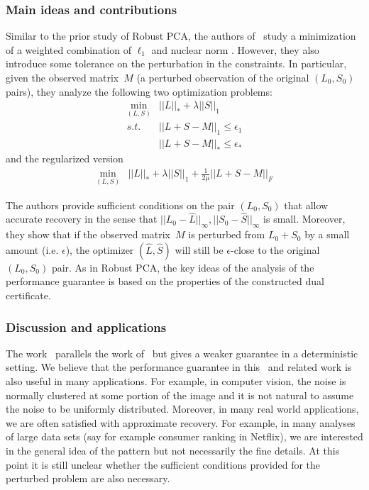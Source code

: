 \subsubsection{Main ideas and contributions}
%
Similar to the prior study of Robust PCA, the authors of~\cite{Hsu:2011ys} study a minimization
of a weighted combination of $\ell_{1}$ and nuclear norm . However, they also introduce some tolerance on the perturbation in the constraints. In particular, given the observed matrix~$M$ (a perturbed observation of the original $(L_{0},S_{0})$ pairs), they analyze the following two optimization problems: %
%
\begin{eqnarray}
\min_{(L,S)} & ||L||_{*}+\lambda||S||_{1}\nonumber \\
s.t. & ||L+S-M||_{1}\le\epsilon_{1}\\
 & ||L+S-M||_{*}\le\epsilon_{*}\nonumber
\end{eqnarray}
%
and the regularized version
\begin{eqnarray}
\min_{(L,S)} & ||L||_{*}+\lambda||S||_{1}+\frac{1}{2\mu}||L+S-M||_{F}
\end{eqnarray}


The authors provide sufficient conditions on the pair $(L_{0},S_{0})$ that allow accurate recovery in the sense that $||L_{0}-\hat{L}||_{\infty},||S_{0}-\hat{S}||_{\infty}$ is small. Moreover, they show that if the observed matrix~$M$ is perturbed from $L_{0}+S_{0}$ by a small amount (i.e. $\epsilon$), the optimizer $(\hat{L},\hat{S})$ will still be $\epsilon$-close to the original $(L_{0},S_{0})$ pair. As in Robust PCA, the key ideas of the analysis of the performance guarantee is based on the properties of the constructed dual certificate.

\subsubsection{Discussion and applications}
The work~\cite{Hsu:2011ys} parallels the work of~\cite{Candes:2011fk} but gives a weaker guarantee in a deterministic setting. %
We believe that the performance guarantee in this~\cite{Hsu:2011ys} and related work is also useful in many applications. For example, in computer vision, the noise  is normally clustered at some portion of the image and it is not natural to assume the noise to be uniformly distributed. Moreover, in many real world applications, we are often satisfied with approximate recovery. %
For example, in many analyses of large data sets (say for example consumer ranking in Netflix), we are interested in the general idea of the pattern but not necessarily the fine details. At this point it is still unclear whether the sufficient conditions provided for the perturbed problem are also necessary. %



